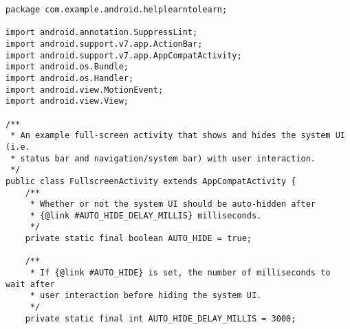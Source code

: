 \documentclass[a4paper, 10pt]{scrartcl}
\begin{document}
\begin{lstlisting}
package com.example.android.helplearntolearn;

import android.annotation.SuppressLint;
import android.support.v7.app.ActionBar;
import android.support.v7.app.AppCompatActivity;
import android.os.Bundle;
import android.os.Handler;
import android.view.MotionEvent;
import android.view.View;

/**
 * An example full-screen activity that shows and hides the system UI (i.e.
 * status bar and navigation/system bar) with user interaction.
 */
public class FullscreenActivity extends AppCompatActivity {
    /**
     * Whether or not the system UI should be auto-hidden after
     * {@link #AUTO_HIDE_DELAY_MILLIS} milliseconds.
     */
    private static final boolean AUTO_HIDE = true;

    /**
     * If {@link #AUTO_HIDE} is set, the number of milliseconds to wait after
     * user interaction before hiding the system UI.
     */
    private static final int AUTO_HIDE_DELAY_MILLIS = 3000;
\end{lstlisting}
\end{document}
